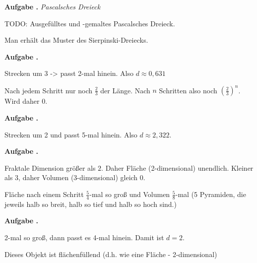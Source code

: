 \documentclass[a4paper,ngerman,12pt]{scrartcl}
\theoremstyle{definition}
\theoremstyle{plain}
\theoremstyle{remark}
\newlength{\aufgabenskip}
\newcounter{aufgabennummer}
\newenvironment{aufgabe}[1]{
  \addtocounter{aufgabennummer}{1}
  \textbf{Aufgabe \theaufgabennummer.} \emph{#1} \par
}{\vspace{\aufgabenskip}}
\begin{document}
\begin{aufgabe}{Pascalsches Dreieck}
	TODO: Ausgefülltes und -gemaltes Pascalsches Dreieck.
	
	Man erhält das Muster des Sierpinski-Dreiecks.
\end{aufgabe}

\begin{aufgabe}{}
	Strecken um 3 -> passt 2-mal hinein. Also $d \approx 0,631$
	
	Nach jedem Schritt nur noch $\frac{2}{3}$ der Länge. Nach $n$ Schritten also noch $\left(\frac{2}{3}\right)^n$. Wird daher 0.
\end{aufgabe}

\begin{aufgabe}{}
	Strecken um 2 und passt 5-mal hinein. Also $d \approx 2,322$.
\end{aufgabe}
	
\begin{aufgabe}{}
	Fraktale Dimension größer als $2$. Daher Fläche (2-dimensional) unendlich. Kleiner als $3$, daher Volumen (3-dimensional) gleich 0.
	
	Fläche nach einem Schritt $\frac{5}{4}$-mal so groß und Volumen $\frac{5}{8}$-mal (5 Pyramiden, die jeweils halb so breit, halb so tief und halb so hoch sind.)
\end{aufgabe}

\begin{aufgabe}{}
	2-mal so groß, dann passt es 4-mal hinein. Damit ist $d = 2$. 
	
	Dieses Objekt ist flächenfüllend (d.h. wie eine Fläche - 2-dimensional)
\end{aufgabe}
\end{document}
